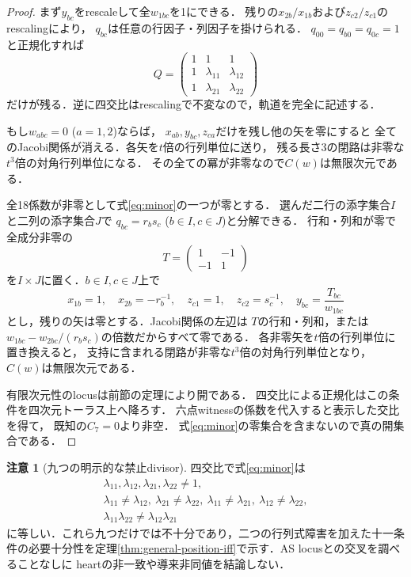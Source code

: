 \documentclass[11pt,a4paper]{ltjsarticle}
\theoremstyle{definition}\newtheorem{remark}[theorem]{注意}
\begin{document}
\begin{proof}
まず$y_{bc}$をrescaleして全$w_{1bc}$を1にできる．
残りの$x_{2b}/x_{1b}$および$z_{c2}/z_{c1}$のrescalingにより，
$q_{bc}$は任意の行因子・列因子を掛けられる．
$q_{00}=q_{b0}=q_{0c}=1$と正規化すれば
\[
Q=\begin{pmatrix}1&1&1\\1&\lambda_{11}&\lambda_{12}\\
1&\lambda_{21}&\lambda_{22}\end{pmatrix}
\]
だけが残る．逆に四交比はrescalingで不変なので，軌道を完全に記述する．

もし$w_{abc}=0$ ($a=1,2$)ならば，
$x_{ab},y_{bc},z_{ca}$だけを残し他の矢を零にすると
全てのJacobi関係が消える．各矢を$t$倍の行列単位に送り，
残る長さ3の閉路は非零な$t^3$倍の対角行列単位になる．
その全ての冪が非零なので$C(w)$は無限次元である．

全18係数が非零として式\eqref{eq:minor}の一つが零とする．
選んだ二行の添字集合$I$と二列の添字集合$J$で
$q_{bc}=r_bs_c$ ($b\in I,c\in J$)と分解できる．
行和・列和が零で全成分非零の
\[
T=\begin{pmatrix}1&-1\\-1&1\end{pmatrix}
\]
を$I\times J$に置く．$b\in I,c\in J$上で
\[
x_{1b}=1,\quad x_{2b}=-r_b^{-1},\quad
z_{c1}=1,\quad z_{c2}=s_c^{-1},\quad
y_{bc}=\frac{T_{bc}}{w_{1bc}}
\]
とし，残りの矢は零とする．Jacobi関係の左辺は
$T$の行和・列和，または
$w_{1bc}-w_{2bc}/(r_bs_c)$の倍数だからすべて零である．
各非零矢を$t$倍の行列単位に置き換えると，
支持に含まれる閉路が非零な$t^3$倍の対角行列単位となり，
$C(w)$は無限次元である．

有限次元性のlocusは前節の定理により開である．
四交比による正規化はこの条件を四次元トーラス上へ降ろす．
六点witnessの係数を代入すると表示した交比を得て，
既知の$C_7=0$より非空．
式\eqref{eq:minor}の零集合を含まないので真の開集合である．
\end{proof}

\begin{remark}[九つの明示的な禁止divisor]
四交比で式\eqref{eq:minor}は
\[
\begin{gathered}
\lambda_{11},\lambda_{12},\lambda_{21},\lambda_{22}\ne1,\\
\lambda_{11}\ne\lambda_{12},\ 
\lambda_{21}\ne\lambda_{22},\
\lambda_{11}\ne\lambda_{21},\
\lambda_{12}\ne\lambda_{22},\\
\lambda_{11}\lambda_{22}\ne\lambda_{12}\lambda_{21}
\end{gathered}
\]
に等しい．これら九つだけでは不十分であり，二つの行列式障害を加えた十一条件の必要十分性を定理\ref{thm:general-position-iff}で示す．AS locusとの交叉を調べることなしに
heartの非一致や導来非同値を結論しない．
\end{remark}





\end{document}
